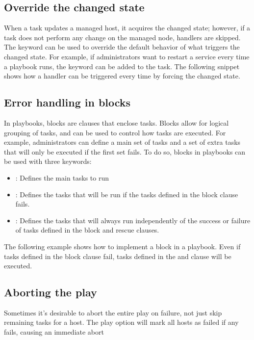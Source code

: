 \subsection{Override the changed state}

When a task updates a managed host, it acquires the changed state; however, if a task does not perform any change on the managed node, handlers are skipped. The  keyword can be used to override the default behavior of what triggers the changed state. For example, if administrators want to restart a service every time a playbook runs, the  keyword can be added to the task. The following snippet shows how a handler can be triggered every time by forcing the changed state.

\subsection{Error handling in blocks}
In playbooks, blocks are clauses that enclose tasks. Blocks allow for logical grouping of tasks, and can be used to control how tasks are executed. For example, administrators can define a main set of tasks and a set of extra tasks that will only be executed if the first set fails. To do so, blocks in playbooks can be used with three keywords:
\begin{itemize}
\item {}: Defines the main tasks to run
\item {}: Defines the tasks that will be run if the tasks defined in the block clause fails.
\item {}: Defines the tasks that will always run independently of the success or failure of tasks defined in the block and rescue clauses.
\end{itemize}

The following example shows how to implement a block in a playbook. Even if tasks defined in the block clause fail, tasks defined in the  and  clause will be executed.

\subsection{Aborting the play}
Sometimes it’s desirable to abort the entire play on failure, not just skip remaining tasks for a host.
The  play option will mark all hosts as failed if any fails, causing an immediate abort

